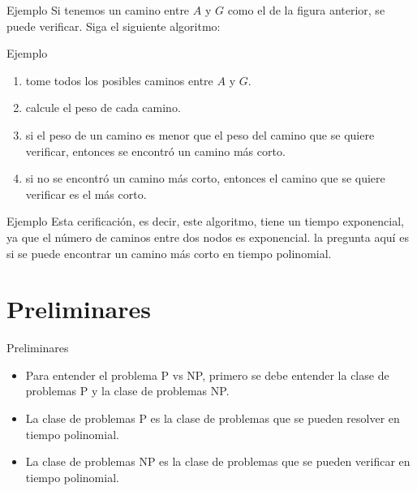 \documentclass[dvipsnames, 11pt]{beamer}
\theoremstyle{plain}
\theoremstyle{definition}
\begin{document}
\begin{frame}{Ejemplo}
    Si tenemos un camino entre $A$ y $G$ como el de la figura anterior, se puede verificar. Siga el siguiente algoritmo:
    
\end{frame}


\begin{frame}{Ejemplo}
    \begin{enumerate}
        \item tome todos los posibles caminos entre $A$ y $G$.\pause
        \item calcule el peso de cada camino.\pause
        \item si el peso de un camino es menor que el peso del camino que se quiere verificar, entonces se encontró un camino más corto.\pause
        \item si no se encontró un camino más corto, entonces el camino que se quiere verificar es el más corto.
    \end{enumerate}
\end{frame}

\begin{frame}{Ejemplo}
    Esta cerificación, es decir, este algoritmo, tiene un tiempo exponencial, ya que el número de caminos entre dos nodos es exponencial. la pregunta aquí es si se puede encontrar un camino más corto en tiempo polinomial.
\end{frame}

\section{Preliminares}
\begin{frame}{Preliminares}
    \begin{itemize}
        \item Para entender el problema P vs NP, primero se debe entender la clase de problemas P y la clase de problemas NP.\pause
        \item La clase de problemas P es la clase de problemas que se pueden resolver en tiempo polinomial.\pause
        \item La clase de problemas NP es la clase de problemas que se pueden verificar en tiempo polinomial.
    \end{itemize}
\end{frame}
\end{document}
